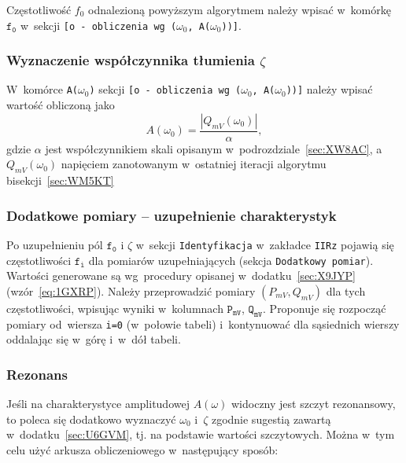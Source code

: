 \documentclass[paper=a4,DIV=12]{lpas}
\begin{document}
Częstotliwość $f_0$ odnalezioną powyższym algorytmem należy wpisać
w~komórkę $\texttt{f}_\texttt{0}$ w~sekcji \texttt{[o - o\-bli\-cze\-nia wg
($\omega_0$, A($\omega_0$))]}.

\subsubsection{Wyznaczenie współczynnika tłumienia \texorpdfstring{$\zeta$}{ζ}}
\label{eq:A20W9}

W~komórce \texttt{A($\omega_0$)} sekcji \texttt{[o - obliczenia wg ($\omega_0$,
A($\omega_0$))]} należy wpisać wartość obliczoną jako
\begin{equation}
  A(\omega_0) = \frac{|Q_{mV}(\omega_0)|}{\alpha},
  \label{eq:A7ZD6}
\end{equation}
gdzie $\alpha$ jest współczynnikiem skali opisanym
w~podrozdziale~\ref{sec:XW8AC}, a~$Q_{mV}(\omega_0)$ napięciem zanotowanym
w~ostatniej iteracji algorytmu bisekcji~\ref{sec:WM5KT}


\subsubsection{Dodatkowe pomiary -- uzupełnienie charakterystyk}
\label{sec:09H54}

Po uzupełnieniu pól $\texttt{f}_\texttt{0}$ i $\zeta$ w~sekcji
\texttt{Identyfikacja} w~zakładce \texttt{IIRz} pojawią się częstotliwości
$\texttt{f}_\texttt{i}$ dla pomiarów uzupełniających (sekcja \texttt{Dodatkowy
pomiar}). Wartości generowane są wg~procedury opisanej w~dodatku~\ref{sec:X9JYP}
(wzór~\eqref{eq:1GXRP}). Należy przeprowadzić pomiary $(P_{mV}, Q_{mV})$ dla
tych częstotliwości, wpisując wyniki w~kolumnach $\texttt{P}_\texttt{mV}$,
$\texttt{Q}_\texttt{mV}$. Proponuje się rozpocząć pomiary od~wiersza
\texttt{i=0} (w~połowie tabeli) i~kontynuować dla sąsiednich wierszy oddalając
się w~górę i~w~dół tabeli.

\subsubsection{Rezonans}
\label{sec:0NZQS}

Jeśli na charakterystyce amplitudowej $A(\omega)$ widoczny jest szczyt
rezonansowy, to poleca się dodatkowo wyznaczyć $\omega_0$ i~$\zeta$ zgodnie
sugestią zawartą w~dodatku~\ref{sec:U6GVM}, tj. na podstawie wartości
szczytowych. Można w~tym celu użyć arkusza obliczeniowego w~następujący sposób:
\end{document}
